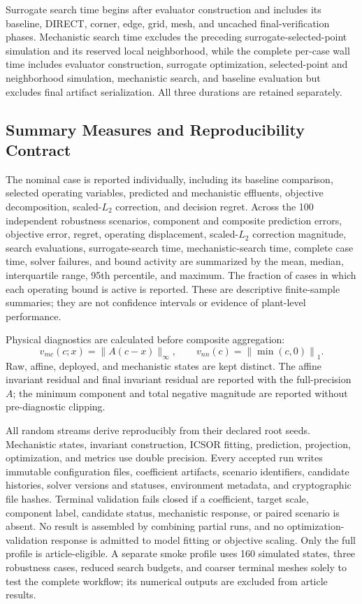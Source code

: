 \documentclass[a4paper,fleqn]{cas-sc}
\begin{document}
Surrogate search time begins after evaluator construction and includes its baseline, DIRECT, corner, edge, grid, mesh, and uncached final-verification phases. Mechanistic search time excludes the preceding surrogate-selected-point simulation and its reserved local neighborhood, while the complete per-case wall time includes evaluator construction, surrogate optimization, selected-point and neighborhood simulation, mechanistic search, and baseline evaluation but excludes final artifact serialization. All three durations are retained separately.

\subsection{Summary Measures and Reproducibility Contract}

The nominal case is reported individually, including its baseline comparison, selected operating variables, predicted and mechanistic effluents, objective decomposition, scaled-$L_2$ correction, and decision regret. Across the 100 independent robustness scenarios, component and composite prediction errors, objective error, regret, operating displacement, scaled-$L_2$ correction magnitude, search evaluations, surrogate-search time, mechanistic-search time, complete case time, solver failures, and bound activity are summarized by the mean, median, interquartile range, 95th percentile, and maximum. The fraction of cases in which each operating bound is active is reported. These are descriptive finite-sample summaries; they are not confidence intervals or evidence of plant-level performance.

Physical diagnostics are calculated before composite aggregation:
\begin{equation}
\label{eq:physical_diagnostics}
v_{mc}(c;x)=\|A(c-x)\|_\infty,
\qquad
v_{nn}(c)=\left\|\min(c,0)\right\|_1.
\end{equation}
Raw, affine, deployed, and mechanistic states are kept distinct. The affine invariant residual and final invariant residual are reported with the full-precision $A$; the minimum component and total negative magnitude are reported without pre-diagnostic clipping.

All random streams derive reproducibly from their declared root seeds. Mechanistic states, invariant construction, ICSOR fitting, prediction, projection, optimization, and metrics use double precision. Every accepted run writes immutable configuration files, coefficient artifacts, scenario identifiers, candidate histories, solver versions and statuses, environment metadata, and cryptographic file hashes. Terminal validation fails closed if a coefficient, target scale, component label, candidate status, mechanistic response, or paired scenario is absent. No result is assembled by combining partial runs, and no optimization-validation response is admitted to model fitting or objective scaling. Only the full profile is article-eligible. A separate smoke profile uses 160 simulated states, three robustness cases, reduced search budgets, and coarser terminal meshes solely to test the complete workflow; its numerical outputs are excluded from article results.
\end{document}
